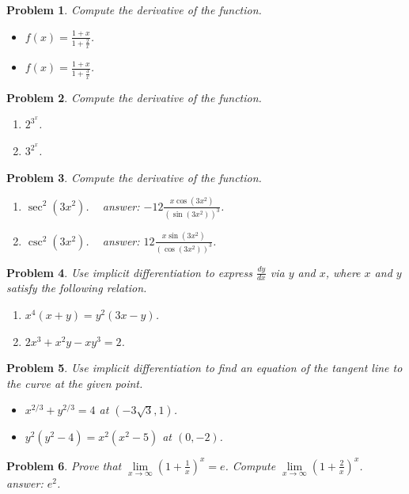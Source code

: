 \documentclass{article}
\newtheorem{problem}{Problem}
\begin{document}
\begin{problem}
Compute the derivative of the function.
\begin{itemize}
\item $f(x)=\frac{1+x }{1+\frac{2}x}$.
\hfill{~}  
\item $f(x)=\frac{1+x }{1+\frac{3}x}$.
\hfill{~}  
\end{itemize}
\end{problem}
\begin{problem}Compute the derivative of the function.
\begin{enumerate}
\item $2^{3^x}$.
\hfill{~}  
\item $3^{2^x}$.
\hfill{~}  
\end{enumerate}
\end{problem}
\begin{problem}Compute the derivative of the function.
\begin{enumerate}
\item $\sec^2 (3x^2)$.
\hfill{~}  
{
answer: $-12 \frac{ x  \cos{}(3 x^{2}) }{(\sin{}(3 x^{2}))^{3}}$.
}
\item $\csc^2 (3x^2)$.
\hfill{~}  
{
answer:
$
12 \frac{x\sin{}(3 x^{2}) }{(\cos{}(3 x^{2}))^{3}}
$.
}
\end{enumerate}
\end{problem}
\begin{problem}
Use implicit differentiation to express $\frac{dy}{dx}$ via $y $ and $x$, where $x$ and $y$ satisfy the following relation.
\begin{enumerate}
\item  $x^4(x+y)=y^2(3x-y)$.
\item $2x^3+x^2y-xy^3=2$.
\end{enumerate}
\end{problem}

\begin{problem}
Use implicit differentiation to find an equation of the tangent line to the curve at the given point.
\begin{itemize}
\item $x^{2/3}+y^{2/3}=4$ at $(-3\sqrt{3}, 1)$.
\item $y^2(y^2-4)= x^2(x^2-5) $ at $(0,-2)$.
\end{itemize}
\end{problem}
\begin{problem}
Prove that $\lim\limits_{x\to \infty} \left( 1+ \frac{1}x \right)^x=e$. Compute $\lim\limits_{x\to \infty} \left( 1+ \frac{2}{x} \right)^x$. 
\hfill{~}  
{
answer:
$
e^2
$.
}
\end{problem}
\end{document}
